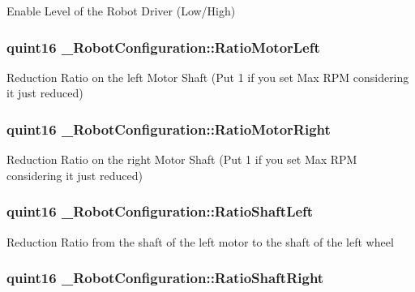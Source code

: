Enable Level of the Robot Driver (Low/\-High) \hypertarget{struct___robot_configuration_a6e49cb2f07852f96c80c4466a20b4334}{
\subsubsection[{Ratio\-Motor\-Left}]{\setlength{\rightskip}{0pt plus 5cm}quint16 \-\_\-\-Robot\-Configuration\-::\-Ratio\-Motor\-Left}}\label{struct___robot_configuration_a6e49cb2f07852f96c80c4466a20b4334}
Reduction Ratio on the left Motor Shaft (Put 1 if you set Max R\-P\-M considering it just reduced) \hypertarget{struct___robot_configuration_ac89f6df8e7eb18f6535a2f46c6ff2895}{
\subsubsection[{Ratio\-Motor\-Right}]{\setlength{\rightskip}{0pt plus 5cm}quint16 \-\_\-\-Robot\-Configuration\-::\-Ratio\-Motor\-Right}}\label{struct___robot_configuration_ac89f6df8e7eb18f6535a2f46c6ff2895}
Reduction Ratio on the right Motor Shaft (Put 1 if you set Max R\-P\-M considering it just reduced) \hypertarget{struct___robot_configuration_a79de71ac2a7be019acea88d1cb1c92cc}{
\subsubsection[{Ratio\-Shaft\-Left}]{\setlength{\rightskip}{0pt plus 5cm}quint16 \-\_\-\-Robot\-Configuration\-::\-Ratio\-Shaft\-Left}}\label{struct___robot_configuration_a79de71ac2a7be019acea88d1cb1c92cc}
Reduction Ratio from the shaft of the left motor to the shaft of the left wheel \hypertarget{struct___robot_configuration_aef75f196a9ac7433f73b13c8be32ee50}{
\subsubsection[{Ratio\-Shaft\-Right}]{\setlength{\rightskip}{0pt plus 5cm}quint16 \-\_\-\-Robot\-Configuration\-::\-Ratio\-Shaft\-Right}}\label{struct___robot_configuration_aef75f196a9ac7433f73b13c8be32ee50}
